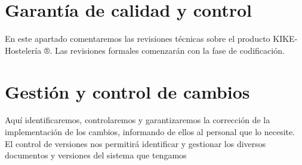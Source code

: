 \documentclass[spanish,a4paper,11pt, twoside]{report}	%
\begin{document}
	\section{Garantía de calidad y control} 
En este apartado comentaremos las revisiones técnicas sobre el producto KIKE- Hostelería ®. Las revisiones formales comenzarán con la fase de codificación.

	\section{Gestión y control de cambios}
Aquí identificaremos, controlaremos y garantizaremos la corrección de la implementación de los cambios, informando de ellos al personal que lo necesite.
El control de versiones nos permitirá identificar y gestionar los diversos documentos y versiones del sistema que tengamos





\newpage
\mbox{}
\thispagestyle{empty}						%
\newpage
\end{document}
